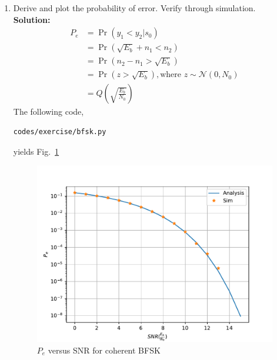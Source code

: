 \documentclass[journal,8pt,onecolumn]{IEEEtran}
\newcommand\figref{Fig.~\ref}
\providecommand{\pr}[1]{\ensuremath{\Pr\left(#1\right)}}
\providecommand{\qfunc}[1]{\ensuremath{Q\left(#1\right)}}
\newcommand{\solution}{\noindent \textbf{Solution: }}
\providecommand{\gauss}[2]{\mathcal{N}\ensuremath{\left(#1,#2\right)}}
\begin{document}
\begin{enumerate}
\item
Derive and plot the probability of error.  Verify through simulation.\\
\solution 
\begin{align}
	P_e &= \pr{y_1<y_2|s_0}\\
	&= \pr{\sqrt{E_b}+n_1<n_2}\\
	&= \pr{n_2-n_1 > \sqrt{E_b}}\\ \nonumber
	&= \pr{z > \sqrt{E_b}}, \text{where $z \sim \gauss{0}{N_0}$}\\
	&= \qfunc{\sqrt{\frac{E_b}{N_0}}}
\end{align}
The following code,
\begin{lstlisting}
codes/exercise/bfsk.py
\end{lstlisting}
yields \figref{fig:bfsk_coherent_ber}
\begin{figure}[H]
\centering
\includegraphics[width=\columnwidth/2]{./figs/bfsk_coherent_ber.pdf}
\caption{$P_e$ versus SNR for coherent BFSK}
\label{fig:bfsk_coherent_ber}
\end{figure}
\end{enumerate}

%
\end{document}
